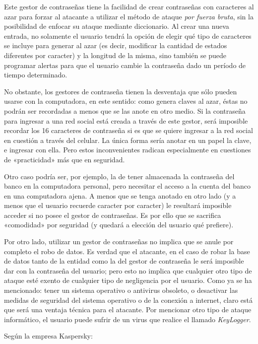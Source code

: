 \documentclass[12pt,a4paper,twoside]{book}
\begin{document}
Este gestor de contraseñas tiene la facilidad de crear contraseñas con caracteres al azar para forzar al atacante a utilizar el método de ataque \textit{por fuerza bruta}, sin la posibilidad de enfocar su ataque mediante diccionario. Al crear una nueva entrada, no solamente el usuario tendrá la opción de elegir qué tipo de caracteres se incluye para generar al azar (es decir, modificar la cantidad de estados diferentes por caracter) y la longitud de la misma, sino también se puede programar alertas para que el usuario cambie la contraseña dado un período de tiempo determinado.

No obstante, los gestores de contraseña tienen la desventaja que sólo pueden usarse con la computadora, en este sentido: como genera claves al azar, éstas no podrán ser recordadas a menos que se las anote en otro medio. Si la contraseña para ingresar a una red social está creada a través de este gestor, será imposible recordar los 16 caracteres de contraseña si es que se quiere ingresar a la red social en cuestión a través del celular. La única forma sería anotar en un papel la clave, e ingresar con ella. Pero estos inconvenientes radican especialmente en cuestiones de «practicidad» más que en seguridad.

Otro caso podría ser, por ejemplo, la de tener almacenada la contraseña del banco en la computadora personal, pero necesitar el acceso a la cuenta del banco en una computadora ajena. A menos que se tenga anotado en otro lado (y a menos que el usuario recuerde caracter por caracter) le resultará imposible acceder si no posee el gestor de contraseñas. Es por ello que se sacrifica «comodidad» por seguridad (y quedará a elección del usuario qué prefiere).

Por otro lado, utilizar un gestor de contraseñas no implica que se anule por completo el robo de datos. Es verdad que el atacante, en el caso de robar la base de datos tanto de la entidad como la del gestor de contraseña le será imposible dar con la contraseña del usuario; pero esto no implica que cualquier otro tipo de ataque esté exento de cualquier tipo de negligencia por el usuario. Como ya se ha mencionado: tener un sistema operativo o antivirus obsoleto, o desactivar las medidas de seguridad del sistema operativo o de la conexión a internet, claro está que será una ventaja técnica para el atacante. Por mencionar otro tipo de ataque informático, el usuario puede sufrir de un virus que realice el llamado \textit{KeyLogger}.

Según la empresa Kaspersky:
\end{document}
